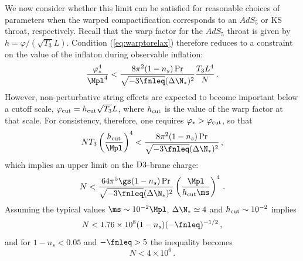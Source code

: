 We now consider whether this limit can be satisfied for reasonable choices 
of parameters when the warped compactification corresponds to 
an $AdS_5$ or KS throat, respectively. Recall that the warp 
factor for the $AdS_5$ throat is given by $h=\varphi/(\sqrt{T_3}L)$.  
Condition (\ref{eq:warptorelax}) therefore reduces to a constraint on the 
value of the inflaton during observable inflation: 
% 
\begin{equation}
\label{eq:phivalue-corr}
\frac{\varphi_*^4}{\Mpl^4} < 
\frac{8\pi^2 (1-n_s)\Pr}{\sqrt{-3\fnleq} ( \Delta \N_*)^2} 
\frac{T_3 L^4}{N} \,.
\end{equation}
%  
However, non-perturbative string effects are expected to become 
important below a cutoff scale, $\varphi_{\rm cut} = 
h_{\rm cut} \sqrt{T_3} L$, where $h_{\rm cut}$ is the value of the 
warp factor at that scale. For consistency, therefore, one requires 
$\varphi_*>\varphi_{\rm cut}$, so that 
% 
\begin{equation}
 N T_3 \left(\frac{h_\mathrm{cut} }{\Mpl}\right)^4 < 
\frac{8\pi^2 (1-n_s)\Pr}{\sqrt{-3\fnleq} ( \Delta \N_*)^2} \,,
\end{equation}
% 
which implies an upper limit on the 
${\rm D3}$-brane charge: 
% 
\begin{equation}
\label{eq:Nlimit-corr}
N< \frac{64\pi^5 \gs (1-n_s)\Pr}{\sqrt{-3\fnleq} ( \Delta \N_*)^2}
\left( \frac{\Mpl}{h_{\rm cut} \ms} \right)^4   \,.
\end{equation}
% 
Assuming the typical values $\ms \sim 10^{-2}\Mpl$, 
$\Delta \N_* \simeq 4$ and 
$h_{\rm cut} \sim 10^{-2}$ implies
%   
\begin{equation}
N < 1.76 \times 10^8 (1-n_s)(-\fnleq)^{-1/2} \,, 
\end{equation}
% 
and for $1-n_s <0.05$ and $-\fnleq>5$ the inequality becomes
% 
\begin{equation}
 N < 4\times 10^6\,.
\end{equation}
%  


